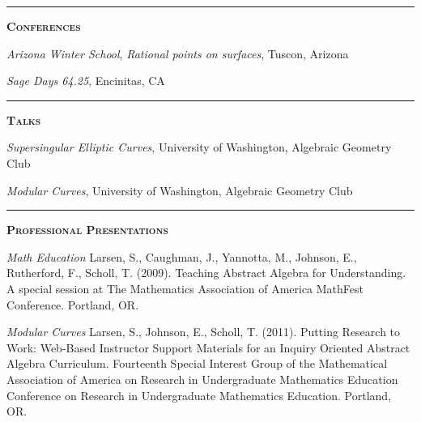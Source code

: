 \documentclass[12pt]{article}
\newcommand{\sectionheading}[1]
{
\bigskip %
\noindent
\hspace{-6.5mm}\textcolor{Gray}{\rule[.75mm]{21.5mm}{1mm}} %
\hspace{.2mm}	%
{\large{\textbf{\textsc{#1}}}} %
}
\newenvironment{date_section}
	{
	\vspace{-1ex}
	\leftmargini = 15ex
		\begin{itemize}[
			labelsep = *,
			labelwidth = 9ex,
			labelindent = 0ex,
			itemindent = !,
			font=\normalfont,
			align=parleft
		]{}
		\itemsep=-1.5mm
	}
	{\end{itemize}\vspace{-2ex}}
\newcommand{\yearmo}[2]{
	\item[
		{\makebox[1ex][r]{#1}}
		\hspace{1ex}
		{\makebox[1ex][l]{#2} }
		] }
\begin{document}
%
%
%
%

	\sectionheading{Conferences} %

		\begin{date_section}

			\yearmo{2015}{Mar.} %
			\emph{Arizona Winter School},
				{\it Rational points on surfaces},
				Tuscon, Arizona

			\yearmo{2015}{May.} %
			\emph{Sage Days 64.25},
				Encinitas, CA

		\end{date_section}

	\sectionheading{Talks} %

		\begin{date_section}

			\yearmo{2014}{Jul.} %
			\emph{Supersingular Elliptic Curves},
				University of Washington,
				Algebraic Geometry Club

			\yearmo{2014}{Feb.} %
			\emph{Modular Curves},
				University of Washington,
				Algebraic Geometry Club

		\end{date_section}

	\sectionheading{Professional Presentations}%

		\begin{date_section}


			\yearmo{2009}{} %
			\emph{Math Education}
				Larsen, S., Caughman, J., Yannotta, M.,
				Johnson, E., Rutherford, F., Scholl, T.
				(2009). Teaching Abstract Algebra for
				Understanding. A special session at The
				Mathematics Association of America MathFest
				Conference. Portland, OR.

			\yearmo{2011}{} %
			\emph{Modular Curves}
				Larsen, S., Johnson, E., Scholl, T. (2011).
				Putting Research to Work: Web-Based Instructor
				Support Materials for an Inquiry Oriented
				Abstract Algebra Curriculum. Fourteenth Special
				Interest Group of the Mathematical Association
				of America on Research in Undergraduate
				Mathematics Education Conference on Research
				in Undergraduate Mathematics Education.
				Portland, OR.

		\end{date_section}
\end{document}
